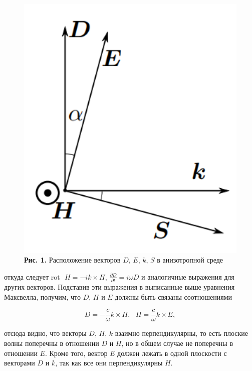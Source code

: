 \documentclass[a4paper,12pt]{article} %
\begin{document}
\begin{figure}
\begin{center}
    \includegraphics[width=1\textwidth]{4.7.2_1.png}
    \textbf{Рис. 1.} Расположение векторов $D$, $E$, $k$, $S$ в анизотропной среде
\end{center}
\end{figure}

\hfill \break откуда следует $\text{rot} \text{ } H = -ik \times H$, $\frac {\partial D} {\partial t} = i \omega D$ и аналогичные выражения для других векторов. Подставив эти выражения в выписанные выше уравнения Максвелла, получим, что $D$, $H$ и $E$ должны быть связаны соотношениями

\begin{equation}\label{ linkname }
D = - \frac{c}{\omega} k \times H, \text{ } H = \frac{c}{\omega}k \times E,
\end{equation}

\hfill \break отсюда видно, что векторы $D$, $H$, $k$ взаимно перпендикулярны, то есть плоские волны поперечны в отношении $D$ и $H$, но в общем случае не поперечны в отношении $E$. Кроме того, вектор $E$ должен лежать в одной плоскости с векторами $D$ и $k$, так как все они перпендикулярны $H$. 
\end{document}
